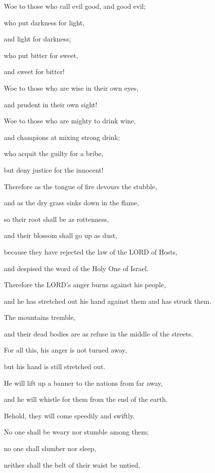 \myverse{}Woe to those who call evil good, and good evil;

who put darkness for light,

and light for darkness;

who put bitter for sweet,

and sweet for bitter!

\myverse{}Woe to those who are wise in their own eyes,

and prudent in their own sight!

\myverse{}Woe to those who are mighty to drink wine,

and champions at mixing strong drink;

\myverse{}who acquit the guilty for a bribe,

but deny justice for the innocent!


\vspace{\baselineskip} \myverse{}Therefore as the tongue of fire devours the stubble,

and as the dry grass sinks down in the flame,

so their root shall be as rottenness,

and their blossom shall go up as dust,

because they have rejected the law of the LORD of Hosts,

and despised the word of the Holy One of Israel.

\myverse{}Therefore the LORD’s anger burns against his people,

and he has stretched out his hand against them and has struck them.

The mountains tremble,

and their dead bodies are as refuse in the middle of the streets.

For all this, his anger is not turned away,

but his hand is still stretched out.


\vspace{\baselineskip} \myverse{}He will lift up a banner to the nations from far away,

and he will whistle for them from the end of the earth.

Behold, they will come speedily and swiftly.

\myverse{}No one shall be weary nor stumble among them;

no one shall slumber nor sleep,

neither shall the belt of their waist be untied,

